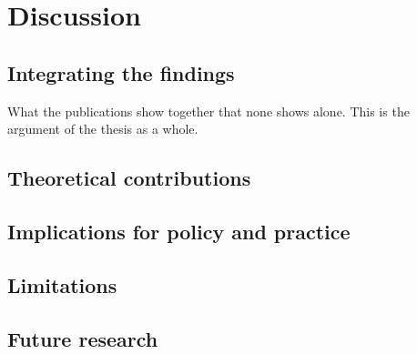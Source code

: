 \chapter{Discussion}\label{ch:discussion}

\section{Integrating the findings}

What the publications show together that none shows alone. This is the
argument of the thesis as a whole.

\section{Theoretical contributions}

\section{Implications for policy and practice}

\section{Limitations}

\section{Future research}

